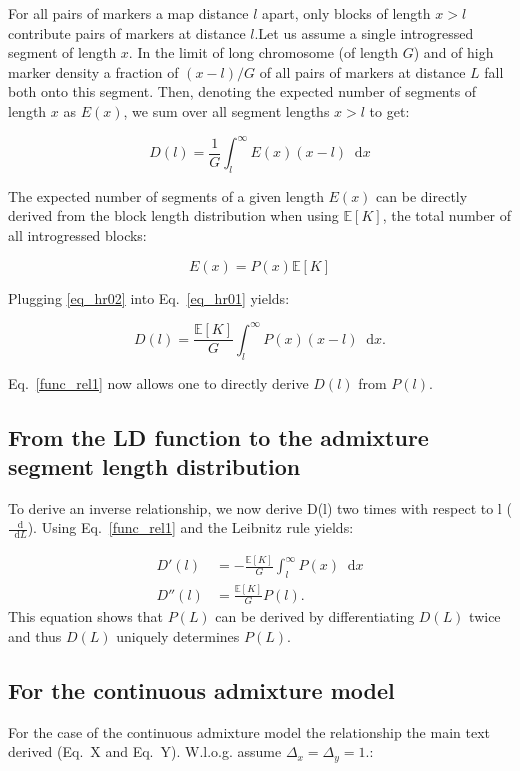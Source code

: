 \documentclass[11pt]{article}
\newcommand*\diff{\mathop{}\!\mathrm{d}}
\begin{document}
For all pairs of markers a map distance $l$ apart, only blocks of length $x>l$ contribute pairs of markers at distance $l$.Let us assume a single introgressed segment of length $x$. In the limit of long chromosome (of length $G$) and of high marker density a fraction of $(x-l)/G$ of all pairs of markers at distance $L$ fall both onto this segment. Then, denoting the expected number of segments of length $x$ as $E(x)$, we sum over all segment lengths $x>l$ to get:

\begin{equation}
D(l) = \frac{1}{G} \int_l^\infty E(x) (x-l) \diff x
\label{eq_hr01}
\end{equation}

The expected number of segments of a given length $E(x)$ can be directly derived from the block length distribution when using $\mathbb{E}[K]$, the total number of all introgressed blocks:

\begin{equation}
E(x) = P(x) \mathbb{E}[K]
\label{eq_hr02}
\end{equation} 

Plugging \ref{eq_hr02} into Eq.~\ref{eq_hr01} yields:

\begin{equation}
D(l) = \frac{\mathbb{E}[K]}{G} \int_l^\infty P(x) (x-l) \diff x.
\label{func_rel1}
\end{equation}

Eq.~\ref{func_rel1} now allows one to directly derive $D(l)$ from $P(l)$. 

\subsection{From the LD function to the admixture segment length distribution}
To derive an inverse relationship, we now derive D(l) two times with respect to l ($\frac{\diff}{\diff L}$). Using Eq.~\ref{func_rel1} and the Leibnitz rule yields:

\begin{align}
D'(l) &= -\frac{\mathbb{E}[K]}{G} \int_l^\infty P(x) \diff x \\
D''(l) &= \frac{\mathbb{E}[K]}{G} P(l). \label{eq_hr2}
\end{align}
This equation shows that $P(L)$ can be derived by differentiating $D(L)$ twice and thus $D(L)$ uniquely determines $P(L)$.

\subsection{For the continuous admixture model}
For the case of the continuous admixture model the relationship the main text derived (Eq.~X and Eq.~Y). W.l.o.g. assume $\Delta_x = \Delta_y = 1$.:
\end{document}

